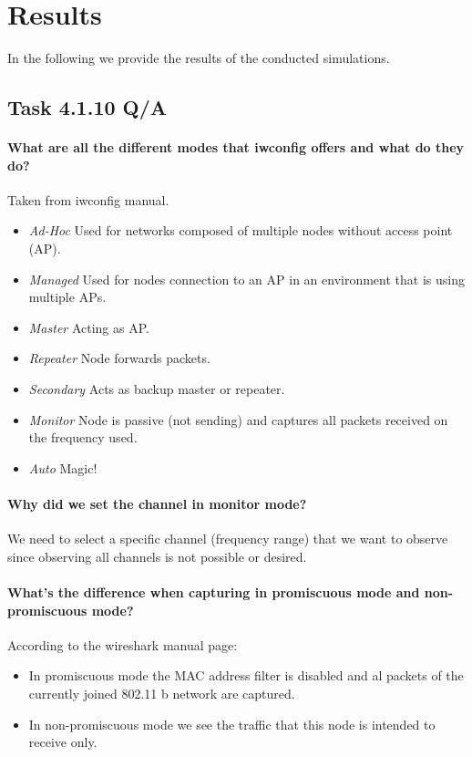 \documentclass[12pt,a4paper]{article}
\begin{document}
\section{Results}
In the following we provide the results of the conducted simulations.
\subsection{Task 4.1.10 Q/A}

\paragraph{What are all the different modes that iwconfig offers and what do they do?}
Taken from iwconfig manual\cite{iwconfig:man}.
\begin{itemize}
	\item \emph{Ad-Hoc}
		Used for networks composed of multiple nodes without access point (AP).
	\item \emph{Managed}
		Used for nodes connection to an AP in an environment that is using multiple APs.
	\item \emph{Master}
		Acting as AP.
	\item \emph{Repeater}
		Node forwards packets.
	\item \emph{Secondary}
		Acts as backup master or repeater.
	\item \emph{Monitor}
		Node is passive (not sending) and captures all packets received on the frequency used.
	\item \emph{Auto}
		Magic!
\end{itemize}


\paragraph{Why did we set the channel in monitor mode?}
We need to select a specific channel (frequency range) that we want to observe since observing all channels is not possible or desired.

\paragraph{What's the difference when capturing in promiscuous mode and non-promiscuous mode?}
According to the wireshark manual page\cite{wireshark:man}:
\begin{itemize}
	\item In promiscuous mode the MAC address filter is disabled and al packets of the currently joined 802.11 b network are captured.

	\item In non-promiscuous mode we see the traffic that this node is intended to receive only.

\end{itemize}
\end{document}
